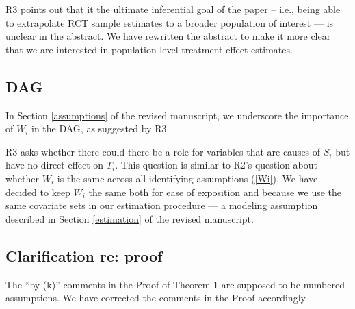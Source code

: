 \documentclass[hidelinks,12pt,letterpaper]{article}
\begin{document}
R3 points out that it the ultimate inferential goal of the paper -- i.e., being able to extrapolate RCT sample estimates to a broader population of interest --- is unclear in the abstract. We have rewritten the abstract to make it more clear that we are interested in population-level treatment effect estimates. 

\subsection{DAG}


In Section \ref{assumptions} of the revised manuscript, we underscore the importance of $W_i$ in the DAG, as suggested by R3.


R3 asks whether there could there be a role for variables that are causes of $S_i$ but have no direct effect on $T_i$. This question is similar to R2's question about whether $W_i$ is the same across all identifying assumptions (\ref{Wi}). We have decided to keep $W_i$ the same both for ease of exposition and because we use the same covariate sets in our estimation procedure --- a modeling assumption described in Section \ref{estimation} of the revised manuscript. 

\subsection{Clarification re: proof}


The ``by (k)'' comments in the Proof of Theorem 1 are supposed to be numbered assumptions. We have corrected the comments in the Proof accordingly. 
\end{document}
